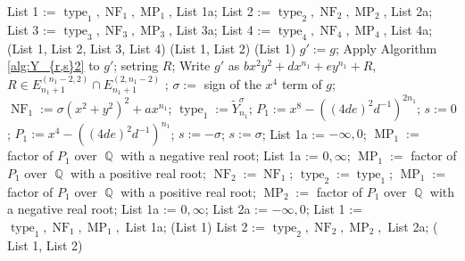 \documentclass[noend]{amsproc}
\theoremstyle{definition}
\DeclareMathOperator{\MP}{MP}
\DeclareMathOperator{\type}{type}
\DeclareMathOperator{\jet}{jet}
\DeclareMathOperator{\NF}{NF}
\DeclareMathOperator{\Q}{\mathbb{Q}}
\begin{document}
\begin{algorithm}[ht]
\begin{algorithmic}[1]
\State List 1 := $\type_1, \NF_1, \MP_1$, List 1a;
\State List 2 := $\type_2, \NF_2, \MP_2$, List 2a;
\State List 3 := $\type_3, \NF_3, \MP_3$, List 3a;
\State List 4 := $\type_4, \NF_4, \MP_4$, List 4a;
\Return(List 1, List 2, List 3, List 4)
\Else
{}
\Return (List 1, List 2)
\Else
\Return (List 1)
\EndIf
\EndIf
\Else
\State $g':= g$;
\State Apply Algorithm \ref{alg:Y_{r,s}2} to $g'$;
\State setring $R$;
\State Write $g'$ as $bx^2y^2+dx^{n_1}+ey^{n_1}+R$, $R\in E^{(n_1-2,2)}_{n_1+1}\cap E^{(2,n_1-2)}_{n_1+1}$ ;
\State $\sigma := $ sign of the $x^4$ term of $g$;
\State $\NF_1:= \sigma(x^2+y^2)^2+ax^{n_1}$;
\State $\type_1 := \widetilde Y_{n_1}^\sigma$;
\State $P_1:= x^8-((4de)^2d^{-1})^{2n_1}$;
\State $s:=0$;
\Else
\State $P_1 := x^4-((4de)^2d^{-1})^{n_1}$;
\State $s := -\sigma$; 
\Else
\State $s := \sigma$; 
\EndIf
\EndIf
{}
\State List 1a := $-\infty, 0$;
\State $\MP_1 := $ factor of $P_1$ over $\Q$ with a negative real root;
\EndIf
{}
\State List 1a := $0,\infty$;
\State $\MP_1 := $ factor of $P_1$ over $\Q$ with a positive real root;
\EndIf
{}
\State $\NF_2 := \NF_1$;
\State $\type_2 := \type_1$;
\State $\MP_1 := $ factor of $P_1$ over $\Q$ with a positive real root;
\State $\MP_2 := $ factor of $P_1$ over $\Q$ with a negative real root;
\State List 1a := $0,\infty$;
\State List 2a := $-\infty, 0$;
\EndIf
\State List 1 := $\type_1, \NF_1, \MP_1,$ List 1a;
\Return (List 1)
\Else
\State List 2 := $\type_2, \NF_2, \MP_2,$ List 2a;
\Return( List 1, List 2)
\EndIf
\EndIf
\end{algorithmic}
\end{algorithm}
\end{document}
